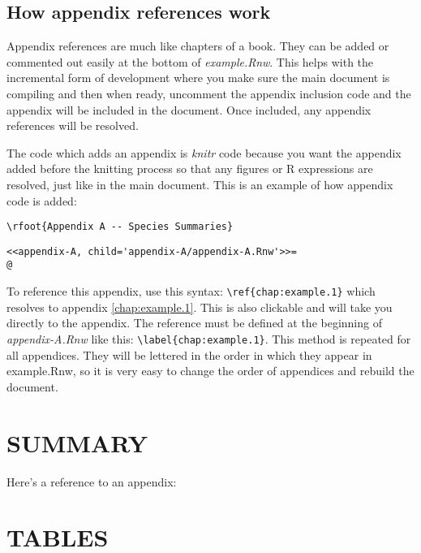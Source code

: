 \documentclass[11pt]{book}\usepackage[]{graphicx}\usepackage[]{color}
\newcommand{\rnwexamplefile}{example.Rnw}
\newcommand{\rnwappendixAfile}{appendix-A.Rnw}
\begin{document}
\subsection{How appendix references work} \label{subsec:how.appendix.refs.work}

Appendix references are much like chapters of a book. They can be added or commented out easily at the bottom of \emph{\rnwexamplefile}. This helps with the incremental form of development where you make sure the main document is compiling and then when ready, uncomment the appendix inclusion code and the appendix will be included in the document. Once included, any appendix references will be resolved.

The code which adds an appendix is \emph{knitr} code because you want the appendix added before the knitting process so that any figures or R expressions are resolved, just like in the main document. This is an example of how appendix code is added:

\verb!\rfoot{Appendix A -- Species Summaries}!

\verb!<<appendix-A, child='appendix-A/appendix-A.Rnw'>>=! \\
\verb!@!

 To reference this appendix, use this syntax: \verb!\ref{chap:example.1}! which resolves to appendix \ref{chap:example.1}. This is also clickable and will take you directly to the appendix. The reference must be defined at the beginning of \emph{\rnwappendixAfile} like this: \verb!\label{chap:example.1}!. This method is repeated for all appendices. They will be lettered in the order in which they appear in \rnwexamplefile, so it is very easy to change the order of appendices and rebuild the document.
 
\bigskip


\section{SUMMARY}

Here's a reference to an appendix: %





\clearpage

\section{TABLES}
\end{document}
